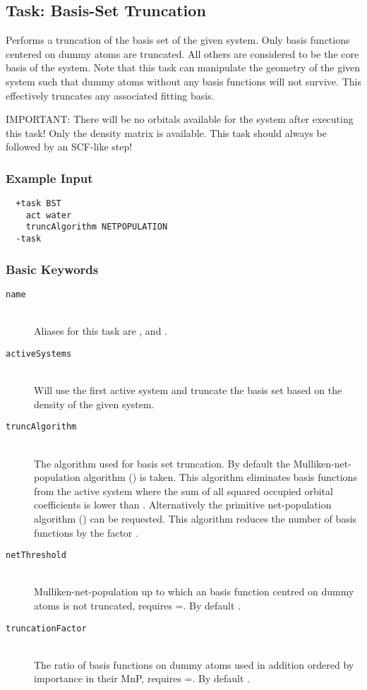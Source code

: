 \subsection{Task: Basis-Set Truncation\label{task:truncation}}
Performs a truncation of the basis set of the given system. Only basis functions centered
on dummy atoms are truncated. All others are considered to be the core basis of the
system. Note that this task can manipulate the geometry of the given system such that 
dummy atoms without any basis functions will not survive. This effectively truncates any associated 
fitting basis.

{\color{red}IMPORTANT:} There will be no orbitals available for the system after executing this
task! Only the density matrix is available. This task should always be followed by an SCF-like step!
\subsubsection{Example Input}
\begin{lstlisting}
  +task BST
    act water
    truncAlgorithm NETPOPULATION
  -task
\end{lstlisting}
\subsubsection{Basic Keywords}
\begin{description}
  \item [\texttt{name}]\hfill \\
    Aliases for this task are ,  and .
  \item [\texttt{activeSystems}]\hfill \\
    Will use the first active system and truncate the basis set based on the density of the given system.
  \item [\texttt{truncAlgorithm}]\hfill \\
    The algorithm used for basis set truncation. By default the Mulliken-net-population
    algorithm () is taken. This algorithm eliminates basis functions from the active
    system where the sum of all squared occupied orbital coefficients is lower than .
    Alternatively the primitive net-population algorithm () can be requested. This
    algorithm reduces the number of basis functions by the factor .
  \item[\texttt{netThreshold}] \hfill \\
    Mulliken-net-population up to which an basis function centred on dummy atoms is not truncated, requires
    =. By default .
  \item[\texttt{truncationFactor}] \hfill \\
    The ratio of basis functions on dummy atoms used in addition ordered by importance in their MnP, requires
    =. By default .
\end{description}